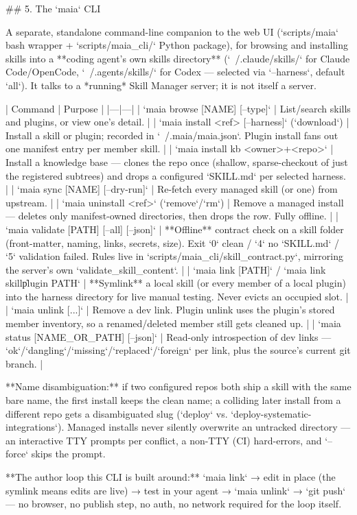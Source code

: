 ## 5. The `maia` CLI

A separate, standalone command-line companion to the web UI (`scripts/maia` bash wrapper + `scripts/maia_cli/` Python package), for browsing and installing skills into a **coding agent's own skills directory** (`~/.claude/skills/` for Claude Code/OpenCode, `~/.agents/skills/` for Codex — selected via `--harness`, default `all`). It talks to a *running* Skill Manager server; it is not itself a server.

| Command | Purpose |
|---|---|
| `maia browse [NAME] [--type]` | List/search skills and plugins, or view one's detail. |
| `maia install <ref> [--harness]` (`download`) | Install a skill or plugin; recorded in `~/.maia/maia.json`. Plugin install fans out one manifest entry per member skill. |
| `maia install kb <owner>+<repo>` | Install a knowledge base — clones the repo once (shallow, sparse-checkout of just the registered subtrees) and drops a configured `SKILL.md` per selected harness. |
| `maia sync [NAME] [--dry-run]` | Re-fetch every managed skill (or one) from upstream. |
| `maia uninstall <ref>` (`remove`/`rm`) | Remove a managed install — deletes only manifest-owned directories, then drops the row. Fully offline. |
| `maia validate [PATH] [--all] [--json]` | **Offline** contract check on a skill folder (front-matter, naming, links, secrets, size). Exit `0` clean / `4` no `SKILL.md` / `5` validation failed. Rules live in `scripts/maia_cli/skill_contract.py`, mirroring the server's own `validate_skill_content`. |
| `maia link [PATH]` / `maia link skill\|plugin PATH` | **Symlink** a local skill (or every member of a local plugin) into the harness directory for live manual testing. Never evicts an occupied slot. |
| `maia unlink [...]` | Remove a dev link. Plugin unlink uses the plugin's stored member inventory, so a renamed/deleted member still gets cleaned up. |
| `maia status [NAME_OR_PATH] [--json]` | Read-only introspection of dev links — `ok`/`dangling`/`missing`/`replaced`/`foreign` per link, plus the source's current git branch. |

**Name disambiguation:** if two configured repos both ship a skill with the same bare name, the first install keeps the clean name; a colliding later install from a different repo gets a disambiguated slug (`deploy` vs. `deploy-systematic-integrations`). Managed installs never silently overwrite an untracked directory — an interactive TTY prompts per conflict, a non-TTY (CI) hard-errors, and `--force` skips the prompt.

**The author loop this CLI is built around:** `maia link` → edit in place (the symlink means edits are live) → test in your agent → `maia unlink` → `git push` — no browser, no publish step, no auth, no network required for the loop itself.

